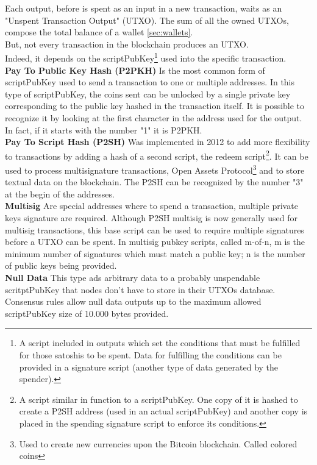 Each output, before is spent as an input in a new transaction, waits as an "Unspent
Transaction Output" (UTXO). The sum of all the owned UTXOs, compose the total balance
of a wallet \ref{sec:wallets}.\\
But, not every transaction in the blockchain produces an UTXO.\\ 
Indeed, it depends on 
the scriptPubKey\footnote{A script included in outputs which set the conditions that 
must be fulfilled for those satoshis to be spent. Data for fulfilling the conditions 
can be provided in a signature script (another type of data generated by the spender).}
used into the specific transaction.
\bigskip\\
\textbf{Pay To Public Key Hash (P2PKH)} 
Is the most common form of scriptPubKey used to send a transaction to one or multiple 
addresses. In this type of scriptPubKey, the coins sent can be unlocked by a single 
private key corresponding to the public key hashed in the transaction itself. It is 
possible to recognize it by looking at the first character in the address used for the
output. In fact, if it starts with the number "1" it is P2PKH.\cite{bitcoin.org}\pagebreak
\bigskip\\
\textbf{Pay To Script Hash (P2SH)}
Was implemented in 2012 to add more flexibility to transactions by adding a hash 
of a second script, the redeem script\footnote{A script similar in function to a 
scriptPubKey. One copy of it is hashed to create a P2SH address (used in an actual 
scriptPubKey) and another copy is placed in the spending signature script to enforce 
its conditions.}. It can be used to process multisignature transactions, 
Open Assets Protocol\footnote{Used to create new currencies upon the Bitcoin blockchain. 
Called colored coins} and to store textual data on the blockchain. The P2SH can 
be recognized by the number "3" at the begin of the addresses.\cite{bitcoin.org}
\bigskip\\
\textbf{Multisig}
Are special addresses where to spend a transaction, multiple private keys signature are required.
Although P2SH multisig is now generally used for multisig transactions, this base 
script can be used to require multiple signatures before a UTXO can be spent.
In multisig pubkey scripts, called m-of-n, m is the minimum number of signatures 
which must match a public key; n is the number of public keys being provided.\cite{bitcoin.org}
\bigskip\\
\textbf{Null Data}
This type ads arbitrary data to a probably unspendable scritptPubKey that nodes don't have
to store in their UTXOs database. Consensus rules allow null data outputs up to the maximum
allowed scriptPubKey size of 10.000 bytes provided.\cite{bitcoin.org}

